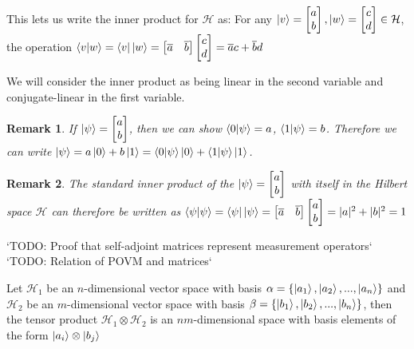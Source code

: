 \documentclass[12pt,twoside,fleqn]{report}
\theoremstyle{thmstyle}
\newtheorem{remark}{Remark}[chapter]
\begin{document}
This lets us write the inner product for $\mathcal{H}$ as:
For any $\ket{v} = \begin{bmatrix} a \\ b \end{bmatrix}, \ket{w} = \begin{bmatrix} c \\ d \end{bmatrix} \in \mathcal{H}$, the operation $\braket{v|w} = \bra{v}\ket{w} = \begin{bmatrix} \overline{a} & \overline{b} \end{bmatrix} \begin{bmatrix} c \\ d \end{bmatrix} = \overline{a} c + \overline{b} d $

We will consider the inner product as being linear in the second variable and conjugate-linear in the first variable.

\begin{remark}
If $\ket{\psi} = \begin{bmatrix} a \\ b \end{bmatrix}$, then we can show $\braket{0|\psi} = a$, $\braket{1|\psi} = b$.
Therefore we can write $\ket{\psi} = a \ket{0} + b \ket{1} = \braket{0|\psi} \ket{0} + \braket{1|\psi} \ket{1}$.
\end{remark}

\begin{remark}
The standard inner product of the $\ket{\psi} = \begin{bmatrix} a \\ b \end{bmatrix}$ with itself in the Hilbert space $\mathcal{H}$ can therefore be written as $\braket{\psi | \psi} = \bra{\psi}\ket{\psi} = \begin{bmatrix} \overline{a} & \overline{b}\end{bmatrix} \begin{bmatrix} a \\ b \end{bmatrix} = |a|^2 + |b|^2 = 1$
\end{remark}

`TODO: Proof that self-adjoint matrices represent measurement operators`
`TODO: Relation of POVM and matrices`

Let $\mathcal{H}_1$ be an $n$-dimensional vector space with basis $\alpha = \{ \ket{a_1}, \ket{a_2}, ..., \ket{a_n} \}$ and $\mathcal{H}_2$ be an $m$-dimensional vector space with basis $\beta = \{ \ket{b_1}, \ket{b_2}, ..., \ket{b_n} \}$, then the tensor product $\mathcal{H}_1 \otimes \mathcal{H}_2$ is an $nm$-dimensional space with basis elements of the form $\ket{a_i} \otimes \ket{b_j}$
\end{document}
